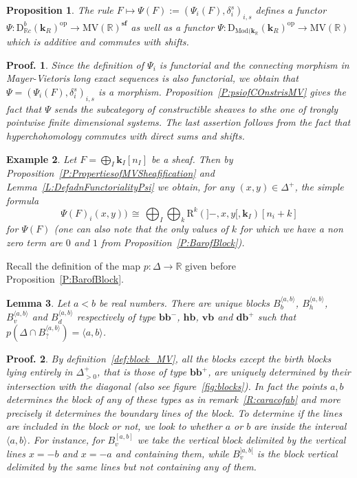 \documentclass[a4paper, english, 11pt]{article}
\newcommand{\kk}[0]{\textbf{k}}
\newcommand{\Mod}[0]{\text{Mod}}
\newcommand{\0}{\vec{0}}
\newcommand{\R}[0]{\mathbb{R}}
\newcommand{\D}[0]{\text{D}}
\newcommand{\op}[0]{\text{op}}
\newcommand{\Rr}[0]{\text{R}}
\newcommand{\MV}{\text{MV}}
\newcommand{\s}{\textbf{sf}}
\newtheorem{prop}{Proposition}[section]
\newtheorem*{pf}{Proof.} }
\newtheorem{ex}[prop]{Example}
\newtheorem{lem}[prop]{Lemma}
\begin{document}
\begin{prop}\label{P:PropertiesofPsi}
The rule $F\mapsto \Psi(F):= (\Psi_i(F), \delta_i^s)_{i,s}$ defines a functor $\Psi: \D^b_{\R c}(\kk_R)^{\op}\to \MV(\R)^\s$ as well as a functor 
$\Psi: \D_{\Mod(\kk_{\R}}(\kk_R)^{\op}\to \MV(\R)$
which is additive and commutes with shifts.
\end{prop}
\begin{pf} Since the definition of $\Psi_i$ is functorial  and the connecting morphism in Mayer-Vietoris long exact sequences is also functorial, we obtain  that $\Psi= (\Psi_i(F), \delta^s_i)_{i,s}$ is a morphism. Proposition~\ref{P:psiofCOnstrisMV} gives the fact that $\Psi$ sends the subcategory of constructible sheaves to sthe one of trongly pointwise finite dimensional systems.  The last assertion follows from the fact that hyperchohomology commutes with direct sums and shifts. 
\end{pf}
\begin{ex}\label{ex:ValueofPsiondirectsum}
 Let $F =\bigoplus_{I} \kk_I[n_I]$ be a sheaf. Then by Proposition~\ref{P:PropertiesofMVSheafification} and Lemma~\ref{L:DefadnFunctorialityPsi} we obtain, for any $(x,y)\in \Delta^+$, the simple formula 
 $$\Psi(F)_i (x,y) ) \, \cong \, \bigoplus_{I} \bigoplus_{k} \Rr^k\left(]-,x,y[, \kk_I\right)[n_i+k]$$ for $\Psi(F)$ (one can also note that the only values of $k$ for which we have a non zero term are $0$ and $1$ from Proposition~\ref{P:BarofBlock}).
\end{ex}



Recall the definition of the map $p: \Delta\to \R$ given before Proposition~\ref{P:BarofBlock}.
\begin{lem}\label{L:Blockassociatedtointerval}
 Let  $a<b$ be real numbers. There are unique  blocks $B_{b}^{\langle a, b\rangle}$, $B_{h}^{\langle a, b\rangle}$, $B_{v}^{\langle a, b\rangle}$ and $B_{d}^{\langle a, b\rangle}$ respectively of type $\textbf{bb}^{-}$, $\textbf{hb}$, $\textbf{vb}$ and $\textbf{db}^+$ such that $p(\Delta\cap B_{?}^{\langle a, b\rangle}) = \langle a,b \rangle$. 
\end{lem}
\begin{pf}
By definition~\ref{def:block_MV}, all the blocks except the birth blocks lying entirely in $\Delta^+_{>0}$, that is those of type $\textbf{bb}^{+}$,  are uniquely determined by their intersection with the diagonal (also see figure~\ref{fig:blocks}). In fact the points $a, b$ determines the block of any of these types as in remark~\ref{R:caracofab} and more precisely it determines the boundary lines of the block. To determine if the lines are included in the block or not, we look to whether $a$ or $b$ are inside the interval $\langle a, b\rangle$. For instance, for $B_v^{[a,b]}$ we take the vertical block delimited by the vertical lines $x=-b$ and $x=-a$ and containing them, while $B_v^{]a,b[}$ is the block vertical delimited by the same lines but not containing any of them. 
\end{pf}
\end{document}
